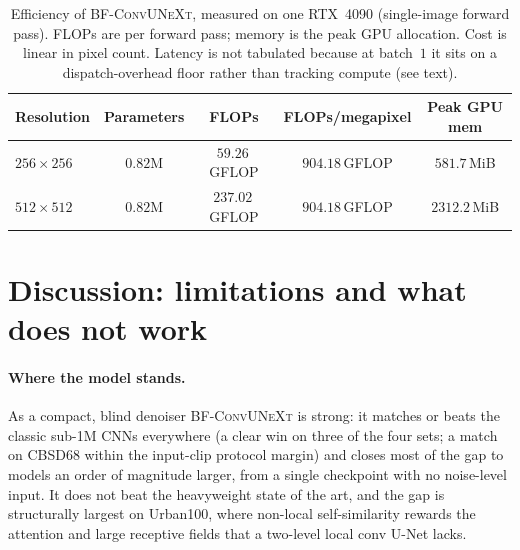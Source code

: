 \documentclass{article}
\newcommand{\model}{\textsc{BF-ConvUNeXt}}
\begin{document}
\begin{table}[H]
\centering
\caption{Efficiency of \model{}, measured on one RTX~4090 (single-image forward pass). FLOPs are per forward pass; memory is the peak GPU allocation. Cost is linear in pixel count. Latency is not tabulated because at batch~$1$ it sits on a dispatch-overhead floor rather than tracking compute (see text).}
\label{tab:efficiency}
\renewcommand{\arraystretch}{1.15}
\begin{tabular}{lcccc}
\toprule
Resolution & Parameters & FLOPs & FLOPs/megapixel & Peak GPU mem \\
\midrule
$256\times256$ & $0.82$M & $59.26$\,GFLOP & $904.18$\,GFLOP & $581.7$\,MiB \\
$512\times512$ & $0.82$M & $237.02$\,GFLOP & $904.18$\,GFLOP & $2312.2$\,MiB \\
\bottomrule
\end{tabular}
\end{table}

\section{Discussion: limitations and what does not work}
\label{sec:limitations}

\paragraph{Where the model stands.}
As a compact, blind denoiser \model{} is strong: it matches or beats the classic sub-1M CNNs everywhere (a clear win on three of the four sets; a match on CBSD68 within the input-clip protocol margin) and closes most of the gap to models an order of magnitude larger, from a single checkpoint with no noise-level input. It does not beat the heavyweight state of the art, and the gap is structurally largest on Urban100, where non-local self-similarity rewards the attention and large receptive fields that a two-level local conv U-Net lacks.
\end{document}
